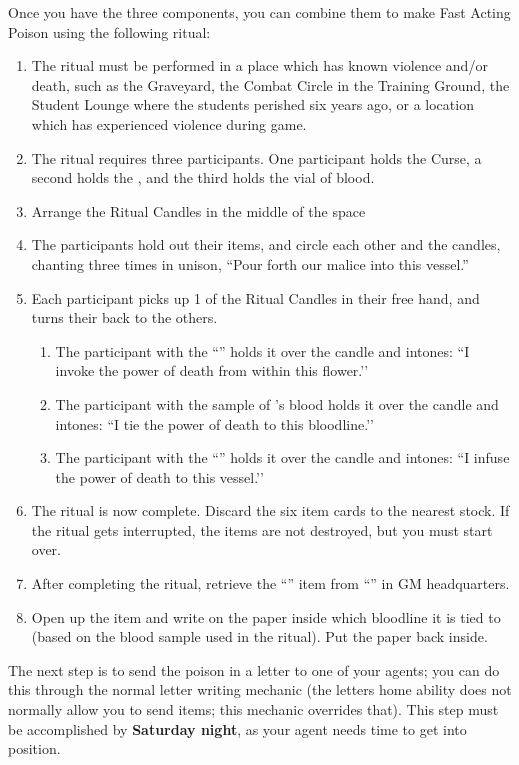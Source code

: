 \documentclass[green]{GL2020}
\begin{document}
Once you have the three components, you can combine them to make Fast Acting Poison using the following ritual:
\begin{enumerate}
  \item The ritual must be performed in a place which has known violence and/or death, such as the Graveyard, the Combat Circle in the Training Ground, the Student Lounge where the students perished six years ago, or a location which has experienced violence during game.
  \item The ritual requires three participants. One participant holds the Curse, a second holds the \iStoneFlower{}, and the third holds the vial of blood.
  \item Arrange the Ritual Candles in the middle of the space
  \item The participants hold out their items, and circle each other and the candles, chanting three times in unison, “Pour forth our malice into this vessel.”
  \item Each participant picks up 1 of the Ritual Candles in their free hand, and turns their back to the others.
   \begin{enumerate}
      \item The participant with the ``\iStoneFlower{}'' holds it over the candle and intones: ``I invoke the power of death from within this flower.’’
      \item The participant with the sample of \cWarlordDaughter{}’s blood holds it over the candle and intones: ``I tie the power of death to this bloodline.’’
      \item The participant with the ``\iSlowActingPoison{}'' holds it over the candle and intones: ``I infuse the power of death to this vessel.’’
   \end{enumerate}
  \item The ritual is now complete. Discard the six item cards to the nearest stock. If the ritual gets interrupted, the items are not destroyed, but you must start over.
  \item After completing the ritual, retrieve the ``\iFastActingPoison{}'' item from ``\sSignP{}'' in GM headquarters.
  \item Open up the item and write on the paper inside which bloodline it is tied to (based on the blood sample used in the ritual). Put the paper back inside.
\end{enumerate}

The next step is to send the poison in a letter to one of your \pShip{} agents; you can do this through the normal letter writing mechanic (the letters home ability does not normally allow you to send items; this mechanic overrides that). This step must be accomplished by \textbf{Saturday night}, as your agent needs time to get into position. 
\end{document}
